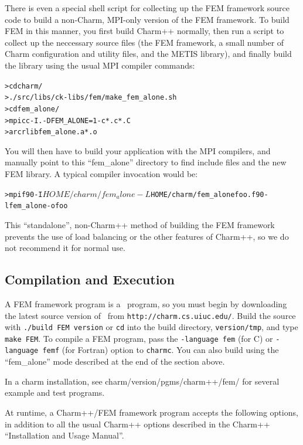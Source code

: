\documentclass[10pt]{article}
\begin{document}
There is even a special shell script for collecting
up the FEM framework source code to build a non-Charm, 
MPI-only version of the FEM framework.
To build FEM in this manner, you first build Charm++ normally,
then run a script to collect up the neccessary source files
(the FEM framework, a small number of Charm configuration 
and utility files, and the METIS library),
and finally build the library using the usual MPI compiler 
commands:
\begin{alltt}
 > cd charm/
 > ./src/libs/ck-libs/fem/make_fem_alone.sh
 > cd fem_alone/
 > mpicc -I. -DFEM_ALONE=1 -c *.c *.C 
 > ar cr libfem_alone.a *.o
\end{alltt}
You will then have to build your application with the MPI
compilers, and manually point to this ``fem\_alone'' 
directory to find include files and the new FEM library.
A typical compiler invocation would be:
\begin{alltt}
 > mpif90 -I$HOME/charm/fem_alone -L$HOME/charm/fem_alone foo.f90 -lfem_alone -o foo
\end{alltt}
This ``standalone'', non-Charm++ method of building the 
FEM framework prevents the use of load balancing or the other
features of Charm++, so we do not recommend it for normal use.


\subsection{Compilation and Execution}

A FEM framework program is a \charmpp\ program, so you must begin by
downloading the latest source version of \charmpp\ from
{\tt http://charm.cs.uiuc.edu/}.  Build the source with 
{\tt ./build FEM version} or {\tt cd} into the build directory, 
{\tt version/tmp}, and type {\tt make FEM}.
To compile a FEM program, pass the {\tt -language fem} (for C) or 
{\tt -language femf} (for Fortran) option to {\tt charmc}.
You can also build using the ``fem\_alone'' mode described
at the end of the section above.

In a charm installation, see charm/version/pgms/charm++/fem/
for several example and test programs.

At runtime, a Charm++/FEM framework program accepts the following
options, in addition to all the usual Charm++ options described in 
the Charm++ ``Installation and Usage Manual''.
\end{document}
